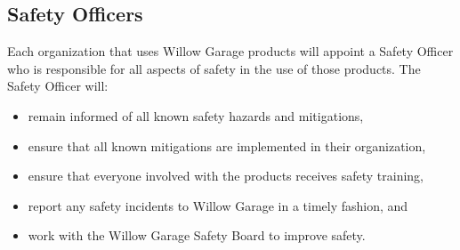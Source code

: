 \subsection{Safety Officers}

Each organization that uses Willow Garage products will appoint a Safety Officer who is responsible for all aspects of safety in the use of those products. The Safety Officer will:
\begin{itemize}
\item remain informed of all known safety hazards and mitigations, 
\item ensure that all known mitigations are implemented in their organization, 
\item ensure that everyone involved with the products receives safety training, 
\item report any safety incidents to Willow Garage in a timely fashion, and 
\item work with the Willow Garage Safety Board to improve safety. 
\end{itemize}
